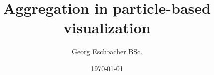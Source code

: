 \newcommand{\iauthor}{Georg Eschbacher BSc.}
\newcommand{\isupervisor}{Assist.-Prof. Dipl.-Ing. Dr.techn. Marc Streit}
\newcommand{\imatrikel}{1410695001}
\newcommand{\ititle}{Aggregation in particle-based visualization}
\newcommand{\ipapertype}{Masterthesis}


\newcommand{\tattainment}{zur Erlangung des akademischen Grades}
\newcommand{\tdegree}{Master of Science}
\newcommand{\tauthor}{VerfasserIn}
\newcommand{\tsubmitted}{Vorgelegt am FH Masterstudiengang MultiMediaTechnology, Fachhochschule Salzburg}
\newcommand{\texamined}{Begutachtet durch}
\newcommand{\tsupervisor}{BetreuerIn}

\title{\ititle}
\author{\iauthor}


\date{\today}